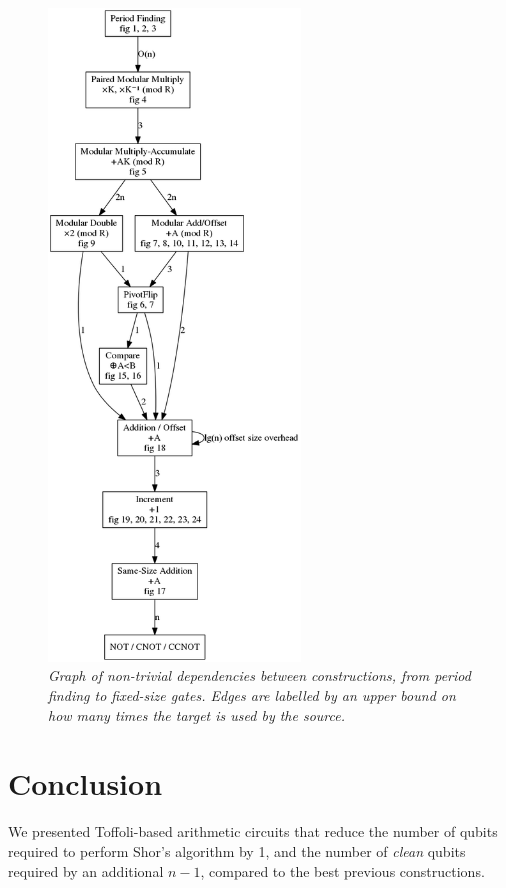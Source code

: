 \documentclass[twocolumn]{article}
\begin{document}
\begin{figure}
  \centering
  \includegraphics[height=17.3cm]{assets/dependencies.png}
  \caption{\em
    Graph of non-trivial dependencies between constructions, from period finding to fixed-size gates.
    Edges are labelled by an upper bound on how many times the target is used by the source.
  }
  \label{fig:dependencies}
\end{figure}


\section{Conclusion} \label{sec:conclusion}

We presented Toffoli-based arithmetic circuits that reduce the number of qubits required to perform Shor's algorithm by 1, and the number of {\em clean} qubits required by an additional $n-1$, compared to the best previous constructions.



\end{document}
